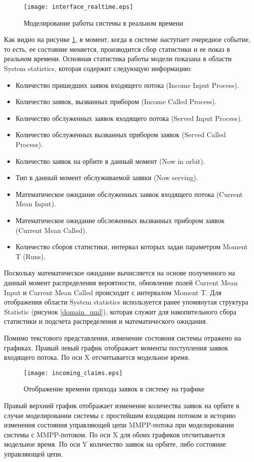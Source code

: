    \begin{figure}[H]
	\centering
	\texttt{[image: interface\_realtime.eps]}
	\caption{Моделирование работы системы в реальном времени}
	\label{interface_realtime}
\end{figure}
Как видно на рисунке \ref{interface_realtime}, в момент, когда в системе наступает очередное событие, то есть, ее состояние меняется, производится сбор статистики и ее показ в реальном времени. Основная статистика работы модели показана в области System statistics, которая содержит следующую информацию:
\begin{itemize}
	\item Количество пришедших заявок входящего потока (Income Input Process).
	\item Количество заявок, вызванных прибором (Income Called Process).
	\item Количество обслуженных заявок входящего потока (Served Input Process).
	\item Количество обслуженных вызванных прибором заявок (Served Called Process).
	\item Количество заявок на орбите в данный момент (Now in orbit).
	\item Тип в данный момент обслуживаемой заявки (Now serving).
	\item Математическое ожидание обслуженных заявок входящего потока (Current Mean Input).
	\item Математическое ожидание обслеженных вызванных прибором заявок (Current Mean Called).
	\item Количество сборов статистики, интервал которых задан параметром Moment T (Runs).
\end{itemize}
Поскольку математическое ожидание вычисляется на основе полученного на данный момент распределения вероятности, обновление полей Current Mean Input и Current Mean Called происходит с интервалом Moment T. Для отображения области System statistics используется ранее упомянутая структура Statistic (рисунок \ref {domain_uml}), которая служит для накопительного сбора статистики и подсчета распределения и математического ожидания. 

Помимо текстового представления, изменение состояния системы отражено на графиках. Правый левый график отображает моменты поступления заявок входящего потока. По оси X отсчитывается модельное время.
   \begin{figure}[H]
	\centering
	\texttt{[image: incoming\_claims.eps]}
	\caption{Отображение времени прихода заявок в систему на графике}
	\label{interface_incoming_claims}
\end{figure}
Правый верхний график отображает изменение количества заявок на орбите в случае моделировании системы с простейшим входящим потоком и историю изменения состояния управляющей цепи MMPP-потока при моделировании системы с MMPP-потоком. По оси X для обоих графиков отсчитывается модельное время. По оси Y количество заявок на орбите, либо состояние управляющей цепи.

